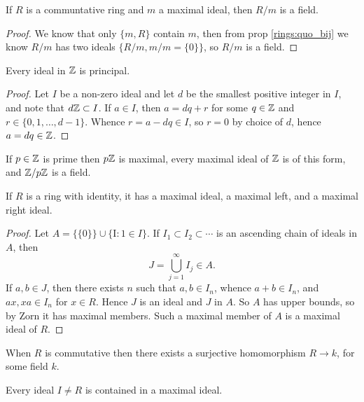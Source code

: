   \begin{prop}
    If $R$ is a communtative ring and $m$ a maximal ideal, then $R/m$ is a
    field.
  \end{prop}

  \begin{proof}
    We know that only $\{m,R\}$ contain $m$, then from prop
    \ref{rings:quo_bij} we know $R/m$ has two ideals $\{R/m, m/m = \{0\}\}$,
    so $R/m$ is a field.
  \end{proof}

  \begin{lemma}
    Every ideal in $\mathbb{Z}$ is principal.
  \end{lemma}

  \begin{proof}
    Let $I$ be a non-zero ideal and let $d$ be the smallest positive integer
    in $I$, and note that $d\mathbb{Z} \subset I$. If $a \in I$, then $a = dq + r$
    for some $q \in \mathbb{Z}$ and $r \in \{0, 1, \ldots, d-1\}$. Whence
    $r = a-dq \in I$, so $r = 0$ by choice of $d$, hence $a = dq \in \mathbb{Z}$.
  \end{proof}

  \begin{prop}
    If $p\in \mathbb{Z}$ is prime then $p\mathbb{Z}$ is maximal, every maximal ideal of $\mathbb{Z}$
    is of this form, and $\mathbb{Z}/p\mathbb{Z}$ is a field.
  \end{prop}

  \begin{lemma}
    If $R$ is a ring with identity, it has a maximal ideal, a maximal left, and
    a maximal right ideal.
  \end{lemma}
  \begin{proof}
    Let $A = \{\{0\}\} \cup \{ $I$ : 1 \in I\}$. If
    $I_1 \subset I_2 \subset \cdots$ is an ascending chain of ideals in $A$,
    then
    \[ J = \bigcup_{j=1}^\infty I_j \in A. \]
    If $a,b \in J$, then there exists $n$ such that $a,b \in I_n$, whence
    $a + b \in I_n$, and $ax,xa \in I_n$ for $x \in R$. Hence $J$ is an ideal
    and $J$ in $A$. So $A$ has upper bounds, so by Zorn it has maximal members.
    Such a maximal member of $A$ is a maximal ideal of $R$.
  \end{proof}

  \begin{cor}
    When $R$ is commutative then there exists a surjective homomorphism
    $R \to k$, for some field $k$.
  \end{cor}

  \begin{cor}
    Every ideal $I \neq R$ is contained in a maximal ideal.
  \end{cor}

